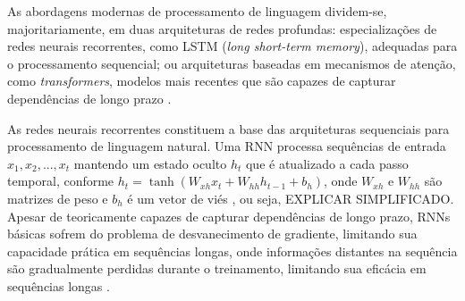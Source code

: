 As abordagens modernas de processamento de linguagem dividem-se, majoritariamente, em duas arquiteturas de redes profundas: especializações de redes neurais recorrentes, como LSTM (\textit{long short-term memory}), adequadas para o processamento sequencial; ou arquiteturas baseadas em mecanismos de atenção, como \textit{transformers}, modelos mais recentes que são capazes de capturar dependências de longo prazo \cite{nlp2}.

As redes neurais recorrentes constituem a base das arquiteturas sequenciais para processamento de linguagem natural. Uma RNN processa sequências de entrada $x_1, x_2, ..., x_{t}$ mantendo um estado oculto $h_{t}$ que é atualizado a cada passo temporal, conforme $h_{t} = \tanh(W_{xh}x_{t} + W_{hh}h_{t-1} + b_{h})$, onde $W_{xh}$ e $W_{hh}$ são matrizes de peso e $b_{h}$ é um vetor de viés \cite{lstm}, ou seja, EXPLICAR SIMPLIFICADO. Apesar de teoricamente capazes de capturar dependências de longo prazo, RNNs básicas sofrem do problema de desvanecimento de gradiente, limitando sua capacidade prática em sequências longas, onde informações distantes na sequência são gradualmente perdidas durante o treinamento, limitando sua eficácia em sequências longas \cite{nlp}.



